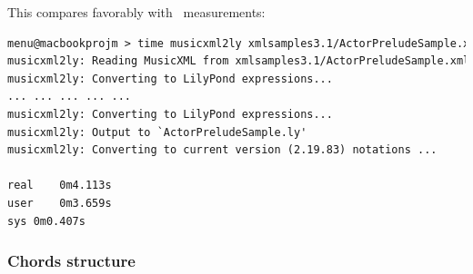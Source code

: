 \documentclass[12pt,a4paper]{article}
\begin{document}
This compares favorably with \mxmlToLy\ measurements:
\begin{lstlisting}[language=XML]
menu@macbookprojm > time musicxml2ly xmlsamples3.1/ActorPreludeSample.xml
musicxml2ly: Reading MusicXML from xmlsamples3.1/ActorPreludeSample.xml ...
musicxml2ly: Converting to LilyPond expressions...
... ... ... ... ...
musicxml2ly: Converting to LilyPond expressions...
musicxml2ly: Output to `ActorPreludeSample.ly'
musicxml2ly: Converting to current version (2.19.83) notations ...

real	0m4.113s
user	0m3.659s
sys	0m0.407s
\end{lstlisting}

\subsubsection{Chords structure}
\end{document}
